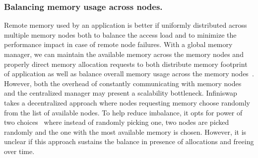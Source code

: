 \subsubsection{Balancing memory usage across nodes.}
Remote memory used by an application is better if uniformly 
distributed across multiple memory nodes both to balance the 
access load and to minimize the performance impact in case of 
remote node failures. With a global memory manager, we can maintain 
the available memory across the memory nodes and properly direct 
memory allocation requests to both distribute memory footprint 
of application as well as balance overall memory usage across 
the memory nodes~\cite{legoos,remregions,kona}. However, both 
the overhead of constantly communicating with memory nodes 
and the centralized manager may present a scalability bottleneck.
Infiniswap~\cite{infiniswap} takes a decentralized approach 
where nodes requesting memory choose randomly from the list of 
available nodes. To help reduce imbalance, it opts for power of 
two choices~\cite{10.5555/924815} where instead of randomly 
picking one, two nodes are picked randomly and the one with the 
most available memory is chosen. However, it is unclear if this 
approach sustains the balance in presence of allocations and 
freeing over time.

% 



